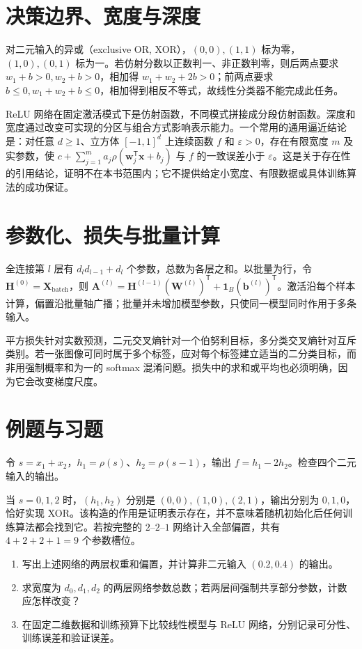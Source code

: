 \section{决策边界、宽度与深度}
对二元输入的异或（exclusive OR, XOR），$(0,0),(1,1)$ 标为零，$(1,0),(0,1)$ 标为一。若仿射分数以正数判一、非正数判零，则后两点要求 $w_1+b>0,w_2+b>0$，相加得 $w_1+w_2+2b>0$；前两点要求 $b\leq0,w_1+w_2+b\leq0$，相加得到相反不等式，故线性分类器不能完成此任务。

ReLU 网络在固定激活模式下是仿射函数，不同模式拼接成分段仿射函数。深度和宽度通过改变可实现的分区与组合方式影响表示能力。一个常用的通用逼近结论是：对任意 $d\geq1$、立方体 $[-1,1]^d$ 上连续函数 $f$ 和 $\varepsilon>0$，存在有限宽度 $m$ 及实参数，使 $c+\sum_{j=1}^ma_j\rho(\mathbf w_j^\mathsf T\mathbf x+b_j)$ 与 $f$ 的一致误差小于 $\varepsilon$。这是关于存在性的引用结论，证明不在本书范围内；它不提供给定小宽度、有限数据或具体训练算法的成功保证。

\section{参数化、损失与批量计算}
全连接第 $l$ 层有 $d_ld_{l-1}+d_l$ 个参数，总数为各层之和。以批量为行，令 $\mathbf H^{(0)}=\mathbf X_{\mathrm{batch}}$，则 $\mathbf A^{(l)}=\mathbf H^{(l-1)}(\mathbf W^{(l)})^\mathsf T+\mathbf1_B(\mathbf b^{(l)})^\mathsf T$。激活沿每个样本计算，偏置沿批量轴广播；批量并未增加模型参数，只使同一模型同时作用于多条输入。

平方损失针对实数预测，二元交叉熵针对一个伯努利目标，多分类交叉熵针对互斥类别。若一张图像可同时属于多个标签，应对每个标签建立适当的二分类目标，而非用强制概率和为一的 softmax 混淆问题。损失中的求和或平均也必须明确，因为它会改变梯度尺度。

\section{例题与习题}
\begin{example}
令 $s=x_1+x_2$，$h_1=\rho(s)$、$h_2=\rho(s-1)$，输出 $f=h_1-2h_2$。检查四个二元输入的输出。
\end{example}
\begin{solve}
当 $s=0,1,2$ 时，$(h_1,h_2)$ 分别是 $(0,0),(1,0),(2,1)$，输出分别为 $0,1,0$，恰好实现 XOR。该构造的作用是证明表示存在，并不意味着随机初始化后任何训练算法都会找到它。若按完整的 $2$--$2$--$1$ 网络计入全部偏置，共有 $4+2+2+1=9$ 个参数槽位。
\end{solve}
\begin{enumerate}
\item 写出上述网络的两层权重和偏置，并计算非二元输入 $(0.2,0.4)$ 的输出。
\item 求宽度为 $d_0,d_1,d_2$ 的两层网络参数总数；若两层间强制共享部分参数，计数应怎样改变？
\item 在固定二维数据和训练预算下比较线性模型与 ReLU 网络，分别记录可分性、训练误差和验证误差。
\end{enumerate}

